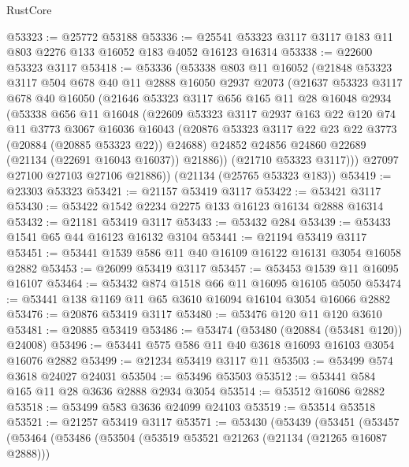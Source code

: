 \begin{lexlean}{RustCore}
\begin{coremodule}
@53323 := @25772 @53188
@53336 := @25541 @53323 @3117 @3117 @183 @11 @803 @2276 @133 @16052 @183 @4052 @16123 @16314
@53338 := @22600 @53323 @3117
@53418 := @53336
    (@53338
      @803
      @11
      @16052
      (@21848
        @53323
        @3117
        @504
        @678
        @40
        @11
        @2888
        @16050
        @2937
        @2073
        (@21637
          @53323
          @3117
          @678
          @40
          @16050
          (@21646
            @53323
            @3117
            @656
            @165
            @11
            @28
            @16048
            @2934
            (@53338
              @656
              @11
              @16048
              (@22609
                @53323
                @3117
                @2937
                @163
                @22
                @120
                @74
                @11
                @3773
                @3067
                @16036
                @16043
                (@20876 @53323 @3117 @22 @23 @22 @3773 (@20884 (@20885 @53323 @22)) @24688)
                @24852
                @24856
                @24860
                @22689
                (@21134 (@22691 @16043 @16037))
                @21886))
            (@21710 @53323 @3117)))
        @27097
        @27100
        @27103
        @27106
        @21886))
    (@21134 (@25765 @53323 @183))
@53419 := @23303 @53323
@53421 := @21157 @53419 @3117
@53422 := @53421 @3117
@53430 := @53422 @1542 @2234 @2275 @133 @16123 @16134 @2888 @16314
@53432 := @21181 @53419 @3117
@53433 := @53432 @284
@53439 := @53433 @1541 @65 @44 @16123 @16132 @3104
@53441 := @21194 @53419 @3117
@53451 := @53441 @1539 @586 @11 @40 @16109 @16122 @16131 @3054 @16058 @2882
@53453 := @26099 @53419 @3117
@53457 := @53453 @1539 @11 @16095 @16107
@53464 := @53432 @874 @1518 @66 @11 @16095 @16105 @5050
@53474 := @53441 @138 @1169 @11 @65 @3610 @16094 @16104 @3054 @16066 @2882
@53476 := @20876 @53419 @3117
@53480 := @53476 @120 @11 @120 @3610
@53481 := @20885 @53419
@53486 := @53474 (@53480 (@20884 (@53481 @120)) @24008)
@53496 := @53441 @575 @586 @11 @40 @3618 @16093 @16103 @3054 @16076 @2882
@53499 := @21234 @53419 @3117 @11
@53503 := @53499 @574 @3618 @24027 @24031
@53504 := @53496 @53503
@53512 := @53441 @584 @165 @11 @28 @3636 @2888 @2934 @3054
@53514 := @53512 @16086 @2882
@53518 := @53499 @583 @3636 @24099 @24103
@53519 := @53514 @53518
@53521 := @21257 @53419 @3117
@53571 := @53430
    (@53439
      (@53451
        (@53457
          (@53464
            (@53486
              (@53504
                (@53519 @53521 @21263 (@21134 (@21265 @16087 @2888)))

\end{coremodule}
\end{lexlean}
